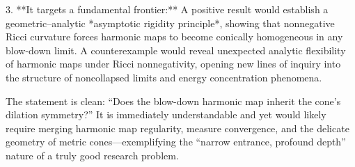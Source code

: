 3. **It targets a fundamental frontier:**  
   A positive result would establish a geometric–analytic *asymptotic rigidity principle*, showing that nonnegative Ricci curvature forces harmonic maps to become conically homogeneous in any blow-down limit.  
   A counterexample would reveal unexpected analytic flexibility of harmonic maps under Ricci nonnegativity, opening new lines of inquiry into the structure of noncollapsed limits and energy concentration phenomena.  

The statement is clean: “Does the blow-down harmonic map inherit the cone’s dilation symmetry?” It is immediately understandable and yet would likely require merging harmonic map regularity, measure convergence, and the delicate geometry of metric cones—exemplifying the “narrow entrance, profound depth” nature of a truly good research problem.